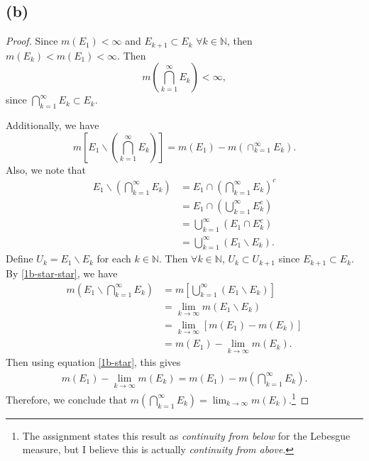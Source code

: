 \documentclass{article}
\newcommand{\N}{\mathbb{N}} %
\begin{document}
\subsection*{(b)}
\begin{proof}
	Since $m(E_1) < \infty$ and $E_{k+1} \subset E_k$ $\forall k \in \N$, then $m(E_k) < m(E_1) < \infty$. Then
	\begin{equation}
		m\left(\bigcap_{k=1}^{\infty} E_k \right) < \infty,
	\end{equation}
	since $\bigcap_{k=1}^{\infty} E_k \subset E_k$.
	
	Additionally, we have
	\begin{equation}\label{1b-star}
		m\left[E_1 \backslash \left(\bigcap_{k=1}^{\infty}E_k\right)\right] = m(E_1) - m\left(\cap_{k=1}^{\infty}E_k\right).
	\end{equation}
	Also, we note that
	\begin{align}
		E_1 \backslash \left(\bigcap_{k=1}^{\infty} E_k \right) &= E_1 \cap \left(\bigcap_{k=1}^{\infty}E_k\right)^c \\
		&= E_1 \cap \left(\bigcup_{k=1}^{\infty} E_k^c\right) \\
		&= \bigcup_{k=1}^{\infty} \left(E_1 \cap E_k^c\right) \\
		&= \bigcup_{k=1}^{\infty}\left(E_1 \backslash E_k \right). \label{1b-star-star}
	\end{align}
	Define $U_k = E_1 \backslash E_k$ for each $k \in \N$. Then $\forall k \in \N$, $U_k \subset U_{k+1}$ since $E_{k+1} \subset E_k$. By \eqref{1b-star-star}, we have
	\begin{align}
		m\left(E_1 \backslash \bigcap_{k=1}^{\infty}E_k\right) &= m\left[\bigcup_{k=1}^{\infty}(E_1 \backslash E_k)\right] \\
		&= \lim_{k \to \infty} m(E_1 \backslash E_k) \\
		&= \lim_{k \to \infty} \left[m(E_1) - m(E_k)\right] \\
		&= m(E_1) - \lim_{k \to \infty}m(E_k).
	\end{align}
	Then using equation \eqref{1b-star}, this gives
	\begin{align}
		m(E_1) - \lim_{k \to \infty} m(E_k) = m(E_1) - m\left(\bigcap_{k=1}^{\infty} E_k \right).
	\end{align}
	Therefore, we conclude that $m\left(\bigcap_{k=1}^{\infty}E_k\right) = \lim_{k \to \infty} m(E_k)$.\footnote{The assignment states this result as \textit{continuity from below} for the Lebesgue measure, but I believe this is actually \textit{continuity from above}.}
\end{proof}
\end{document}
